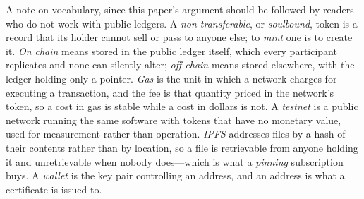 A note on vocabulary, since this paper's argument should be followed by readers
who do not work with public ledgers. A \emph{non-transferable}, or
\emph{soulbound}, token is a record that its holder cannot sell or pass to anyone
else; to \emph{mint} one is to create it. \emph{On chain} means stored in the
public ledger itself, which every participant replicates and none can silently
alter; \emph{off chain} means stored elsewhere, with the ledger holding only a
pointer. \emph{Gas} is the unit in which a network charges for executing a
transaction, and the fee is that quantity priced in the network's token, so a cost
in gas is stable while a cost in dollars is not. A \emph{testnet} is a public
network running the same software with tokens that have no monetary value, used
for measurement rather than operation. \emph{IPFS} addresses files by a hash of
their contents rather than by location, so a file is retrievable from anyone
holding it and unretrievable when nobody does---which is what a \emph{pinning}
subscription buys. A \emph{wallet} is the key pair controlling an address, and an
address is what a certificate is issued to.

